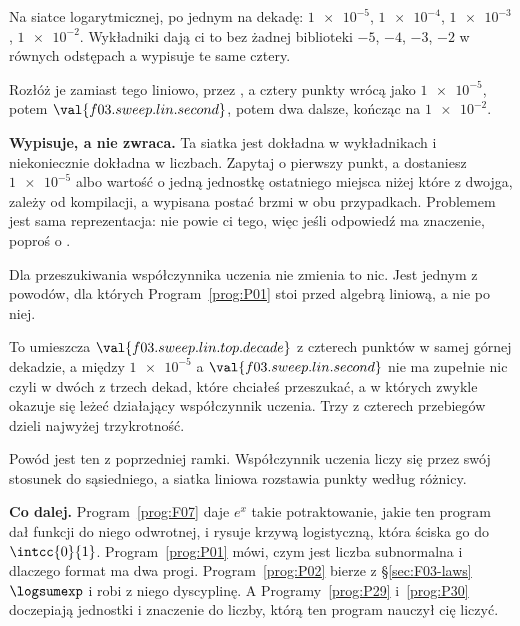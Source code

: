 \begin{fr}
\begin{ansblock}
Na siatce logarytmicznej, po jednym na dekadę: $\num{1e-5}$, $\num{1e-4}$,
$\num{1e-3}$, $\num{1e-2}$. Wykładniki dają ci to bez żadnej biblioteki
\dash{} $-5$, $-4$, $-3$, $-2$ w równych odstępach \dash{} a
 wypisuje te same cztery.

Rozłóż je zamiast tego liniowo, przez , a
cztery punkty wrócą jako $\num{1e-5}$, potem $\val{f03.sweep.lin.second}$,
potem dwa dalsze, kończąc na $\num{1e-2}$.
\end{ansblock}

\begin{note}
\textbf{Wypisuje, a nie zwraca.} Ta siatka jest dokładna w wykładnikach i
niekoniecznie dokładna w liczbach. Zapytaj  o pierwszy punkt,
a dostaniesz $\num{1e-5}$ albo wartość o jedną jednostkę ostatniego miejsca
niżej \dash{} które z dwojga, zależy od kompilacji, a wypisana postać brzmi
 w obu przypadkach. Problemem jest sama reprezentacja: nie powie
ci tego, więc jeśli odpowiedź ma znaczenie, poproś o .

Dla przeszukiwania współczynnika uczenia nie zmienia to nic. Jest jednym z
powodów, dla których Program~\ref{prog:P01} stoi przed algebrą liniową, a nie
po niej.
\end{note}

To umieszcza $\val{f03.sweep.lin.top.decade}$ z czterech punktów w samej górnej
dekadzie, a między $\num{1e-5}$ a $\val{f03.sweep.lin.second}$ nie ma
zupełnie nic \dash{} czyli w dwóch z trzech dekad, które chciałeś przeszukać, a
w których zwykle okazuje się leżeć działający współczynnik uczenia. Trzy z
czterech przebiegów dzieli najwyżej trzykrotność.

Powód jest ten z poprzedniej ramki. Współczynnik uczenia liczy się przez swój
stosunek do sąsiedniego, a siatka liniowa rozstawia punkty według różnicy.

\medskip
\noindent
\textbf{Co dalej.} Program~\ref{prog:F07} daje $e^{x}$ takie potraktowanie,
jakie ten program dał funkcji do niego odwrotnej, i rysuje krzywą logistyczną,
która ściska go do $\intcc{0}{1}$. Program~\ref{prog:P01} mówi, czym jest
liczba subnormalna i dlaczego format ma dwa progi. Program~\ref{prog:P02}
bierze z \S\ref{sec:F03-laws} $\logsumexp$ i robi z niego dyscyplinę.
A Programy~\ref{prog:P29} i~\ref{prog:P30} doczepiają jednostki i znaczenie do
liczby, którą ten program nauczył cię liczyć.
\end{fr}

